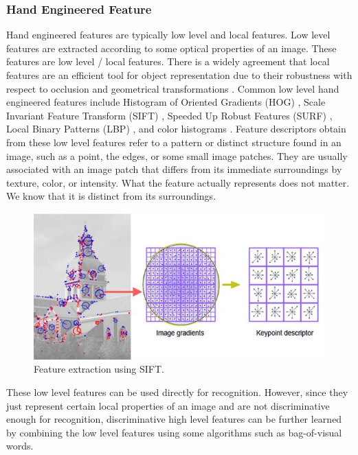 \subsubsection{Hand Engineered Feature}
Hand engineered features are typically low level and local features.
Low level features are extracted according to some optical properties of an image. These features are low level / local features. There is a widely agreement that local features are an efficient tool for object representation due to their robustness with respect to occlusion and geometrical transformations \cite{van2006coloring}. Common low level hand engineered features include Histogram of Oriented Gradients (HOG) \cite{dalal2005histograms}, Scale Invariant Feature Transform (SIFT) \cite{lowe1999object}, Speeded Up Robust Features (SURF) \cite{bay2006surf}, Local Binary Patterns (LBP) \cite{ojala2002multiresolution}, and color histograms \cite{birchfield1998elliptical}. Feature descriptors obtain from these low level features refer to a pattern or distinct structure found in an image, such as a point, the edges, or some small image patches. They are usually associated with an image patch that differs from its immediate surroundings by texture, color, or intensity. What the feature actually represents does not matter. We know that it is distinct from its surroundings.
\begin{figure}[h]
	\centering
	\includegraphics[scale=.6]{introduction/fig/sift.jpg}
	\caption{Feature extraction using SIFT.}\label{fig:intro:sift}
\end{figure}
These low level features can be used directly for recognition. However, since they just represent certain local properties of an image and are not discriminative enough for recognition, discriminative high level features can be further learned by combining the low level features using some algorithms such as bag-of-visual words\cite{lazebnik2006beyond}. 


